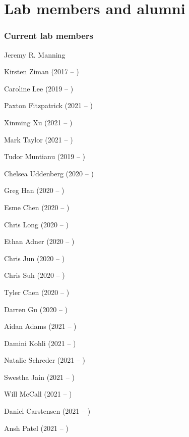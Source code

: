 \documentclass{tufte-book} %
\begin{document}
\chapter{Lab members and alumni}\label{ch:members}
\begin{fullwidth}
\subsection{Current lab members}\label{sec:curr_members}
\bigskip

\enskip Jeremy R. Manning


\begin{multicols}{2}\raggedcolumns
\begin{list}{\quad}{}
\item Kirsten Ziman (2017 -- )
\item Caroline Lee (2019 -- )
\item Paxton Fitzpatrick (2021 -- )
\item Xinming Xu (2021 -- )
\end{list}
\end{multicols}


\begin{multicols}{2}\raggedcolumns
\begin{list}{\quad}{}
\item Mark Taylor (2021 -- )
\end{list}
\end{multicols}


\begin{multicols}{2}\raggedcolumns
\begin{list}{\quad}{}
\item Tudor Muntianu (2019 -- )
\item Chelsea Uddenberg (2020 -- )
\item Greg Han (2020 -- )
\item Esme Chen (2020 -- )
\item Chris Long (2020 -- )
\item Ethan Adner (2020 -- )
\item Chris Jun (2020 -- )
\item Chris Suh (2020 -- )
\item Tyler Chen (2020 -- )
\item Darren Gu (2020 -- )
\item Aidan Adams (2021 -- )
\item Damini Kohli (2021 -- )
\item Natalie Schreder (2021 -- )
\item Swestha Jain (2021 -- )
\item Will McCall (2021 -- )
\item Daniel Carstensen (2021 -- )
\item Ansh Patel (2021 -- )
\end{list}
\end{multicols}


\end{fullwidth}
\end{document}
